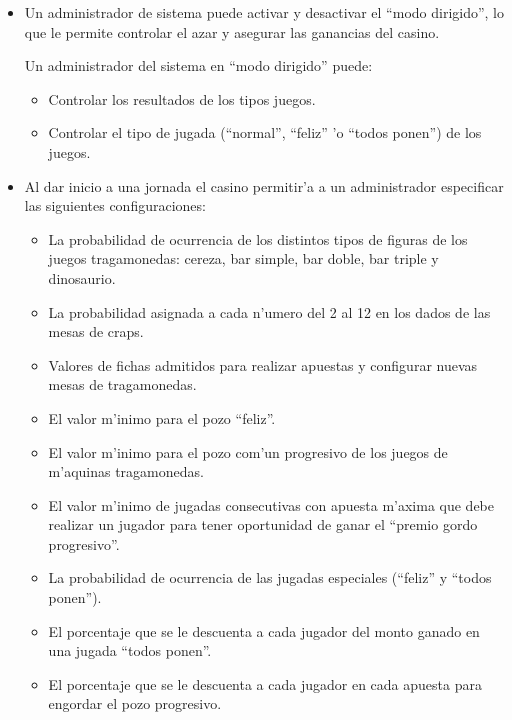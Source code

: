 \begin{itemize}

\item {}

    Un administrador de sistema puede activar y desactivar el ``modo dirigido'', lo que le permite controlar el azar y asegurar las ganancias del casino.

    Un administrador del sistema en ``modo dirigido'' puede:
    \begin{itemize}
        \item Controlar los resultados de los tipos juegos.
        \item Controlar el tipo de jugada (``normal'', ``feliz'' 'o ``todos ponen'') de los juegos.
    \end{itemize}

\item {}

    Al dar inicio a una jornada el casino permitir'a a un administrador especificar las siguientes configuraciones:
    \begin{itemize}
        \item La probabilidad de ocurrencia de los distintos tipos de figuras de los juegos tragamonedas: cereza, bar simple, bar doble, bar triple y dinosaurio.
        \item La probabilidad asignada a cada n'umero del 2 al 12 en los dados de las mesas de craps.
        \item Valores de fichas admitidos para realizar apuestas y configurar nuevas mesas de tragamonedas.
        \item El valor m'inimo para el pozo ``feliz''.
        \item El valor m'inimo para el pozo com'un progresivo de los juegos de m'aquinas tragamonedas.
        \item El valor m'inimo de jugadas consecutivas con apuesta m'axima que debe realizar un jugador para tener oportunidad de ganar el ``premio gordo progresivo''.
        \item La probabilidad de ocurrencia de las jugadas especiales (``feliz'' y ``todos ponen'').
        \item El porcentaje que se le descuenta a cada jugador del monto ganado en una jugada ``todos ponen''.
        \item El porcentaje que se le descuenta a cada jugador en cada apuesta para engordar el pozo progresivo.
    \end{itemize}


\end{itemize}
